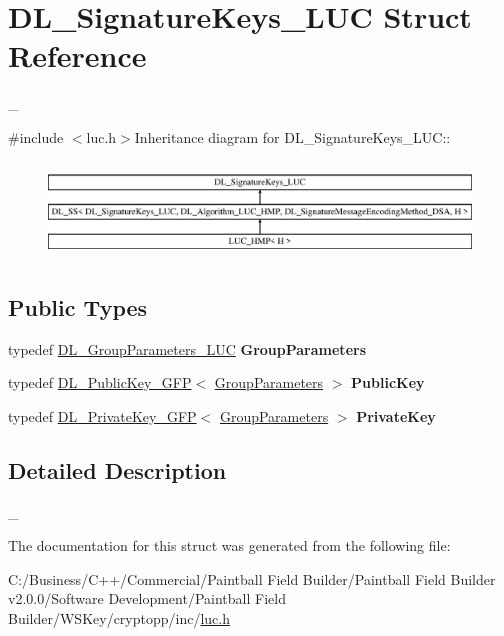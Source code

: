 \hypertarget{struct_d_l___signature_keys___l_u_c}{
\section{DL\_\-SignatureKeys\_\-LUC Struct Reference}
\label{struct_d_l___signature_keys___l_u_c}
}


\_\-  


{\ttfamily \#include $<$luc.h$>$}Inheritance diagram for DL\_\-SignatureKeys\_\-LUC::\begin{figure}[H]
\begin{center}
\leavevmode
\includegraphics[height=2.57274cm]{struct_d_l___signature_keys___l_u_c}
\end{center}
\end{figure}
\subsection*{Public Types}
\begin{DoxyCompactItemize}
\item 
\hypertarget{struct_d_l___signature_keys___l_u_c_a5dc8ed5381020f71323e1702ca8cd935}{
typedef \hyperlink{class_d_l___group_parameters___l_u_c}{DL\_\-GroupParameters\_\-LUC} {\bfseries GroupParameters}}
\label{struct_d_l___signature_keys___l_u_c_a5dc8ed5381020f71323e1702ca8cd935}

\item 
\hypertarget{struct_d_l___signature_keys___l_u_c_aad460d5eae27d58c6634abb331cbb25f}{
typedef \hyperlink{class_d_l___public_key___g_f_p}{DL\_\-PublicKey\_\-GFP}$<$ \hyperlink{class_d_l___group_parameters___l_u_c}{GroupParameters} $>$ {\bfseries PublicKey}}
\label{struct_d_l___signature_keys___l_u_c_aad460d5eae27d58c6634abb331cbb25f}

\item 
\hypertarget{struct_d_l___signature_keys___l_u_c_aa87b181eb1edf12780e63169290ca485}{
typedef \hyperlink{class_d_l___private_key___g_f_p}{DL\_\-PrivateKey\_\-GFP}$<$ \hyperlink{class_d_l___group_parameters___l_u_c}{GroupParameters} $>$ {\bfseries PrivateKey}}
\label{struct_d_l___signature_keys___l_u_c_aa87b181eb1edf12780e63169290ca485}

\end{DoxyCompactItemize}


\subsection{Detailed Description}
\_\- 

The documentation for this struct was generated from the following file:\begin{DoxyCompactItemize}
\item 
C:/Business/C++/Commercial/Paintball Field Builder/Paintball Field Builder v2.0.0/Software Development/Paintball Field Builder/WSKey/cryptopp/inc/\hyperlink{luc_8h}{luc.h}\end{DoxyCompactItemize}

